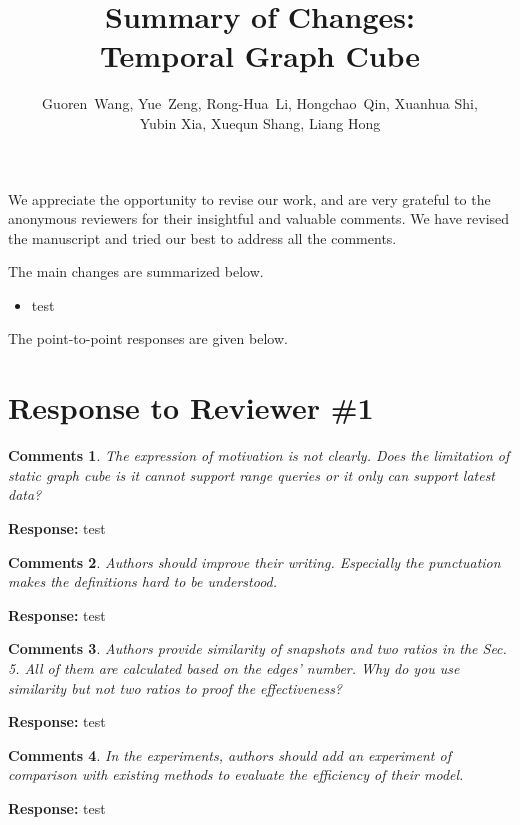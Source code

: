 \documentclass{article}
\title{Summary of Changes: \\Temporal Graph Cube}
\author{Guoren~Wang,
	Yue~Zeng,
	Rong-Hua~Li,
	Hongchao~Qin,
	Xuanhua Shi,\\
	Yubin Xia, 
	Xuequn Shang, 
	Liang Hong
}
\date{}
\newtheorem{Comments}{\textbf{Comments}}
\begin{document}
\maketitle

We appreciate the opportunity to revise our work, and are very grateful to the anonymous reviewers for their insightful and valuable comments. We have revised the manuscript and tried our best to address all the comments. 

The main changes are summarized below.
\begin{itemize}

\item test

\end{itemize}

The point-to-point responses are given below.
	
\section{Response to Reviewer \#1}
\begin{Comments}
The expression of motivation is not clearly. Does the limitation of static graph cube is it cannot support range queries or it only can support latest data?
\end{Comments}
\noindent \textbf{Response:} test

\begin{Comments}
Authors should improve their writing. Especially the punctuation makes the definitions hard to be understood.
\end{Comments}
\noindent \textbf{Response:} test

\begin{Comments}
Authors provide similarity of snapshots and two ratios in the Sec. 5. All of them are calculated based on the edges’ number. Why do you use similarity but not two ratios to proof the effectiveness?
\end{Comments}
\noindent \textbf{Response:} test

\begin{Comments}
In the experiments, authors should add an experiment of comparison with existing methods to evaluate the efficiency of their model.
\end{Comments}
\noindent \textbf{Response:} test
\end{document}

